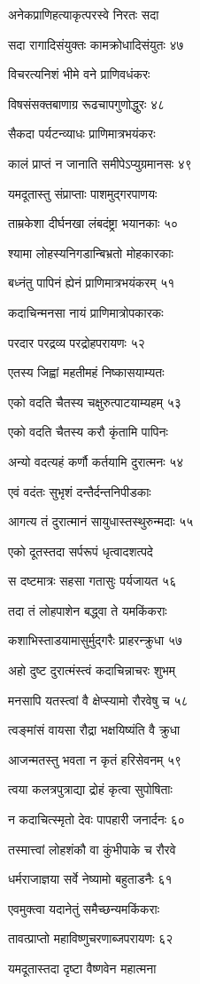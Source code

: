 अनेकप्राणिहत्याकृत्परस्वे निरतः सदा

सदा रागादिसंयुक्तः कामक्रोधादिसंयुतः ४७

विचरत्यनिशं भीमे वने प्राणिवधंकरः

विषसंसक्तबाणाग्र रूढचापगुणोद्धुरः ४८

सैकदा पर्यटन्व्याधः प्राणिमात्रभयंकरः

कालं प्राप्तं न जानाति समीपेऽप्युग्रमानसः ४९

यमदूतास्तु संप्राप्ताः पाशमुद्गरपाणयः

ताम्रकेशा दीर्घनखा लंबदंष्ट्रा भयानकाः ५०

श्यामा लोहस्यनिगडान्बिभ्रतो मोहकारकाः

बध्नंतु पापिनं ह्येनं प्राणिमात्रभयंकरम् ५१

कदाचिन्मनसा नायं प्राणिमात्रोपकारकः

परदार परद्रव्य परद्रोहपरायणः ५२

एतस्य जिह्वां महतीमहं निष्कासयाम्यतः

एको वदति चैतस्य चक्षुरुत्पाटयाम्यहम् ५३

एको वदति चैतस्य करौ कृंतामि पापिनः

अन्यो वदत्यहं कर्णौ कर्तयामि दुरात्मनः ५४

एवं वदंतः सुभृशं दन्तैर्दन्तनिपीडकाः

आगत्य तं दुरात्मानं सायुधास्तस्थुरुन्मदाः ५५

एको दूतस्तदा सर्परूपं धृत्वादशत्पदे

स दष्टमात्रः सहसा गतासुः पर्यजायत ५६

तदा तं लोहपाशेन बद्ध्वा ते यमकिंकराः

कशाभिस्ताडयामासुर्मुद्गरैः प्राहरन्क्रुधा ५७

अहो दुष्ट दुरात्मंस्त्वं कदाचिन्नाचरः शुभम्

मनसापि यतस्त्वां वै क्षेप्स्यामो रौरवेषु च ५८

त्वङ्मांसं वायसा रौद्रा भक्षयिष्यंति वै क्रुधा

आजन्मतस्तु भवता न कृतं हरिसेवनम् ५९

त्वया कलत्रपुत्राद्या द्रोहं कृत्वा सुपोषिताः

न कदाचित्स्मृतो देवः पापहारी जनार्दनः ६०

तस्मात्त्वां लोहशंकौ वा कुंभीपाके च रौरवे

धर्मराजाज्ञया सर्वे नेष्यामो बहुताडनैः ६१

एवमुक्त्वा यदानेतुं समैच्छन्यमकिंकराः

तावत्प्राप्तो महाविष्णुचरणाब्जपरायणः ६२

यमदूतास्तदा दृष्टा वैष्णवेन महात्मना

